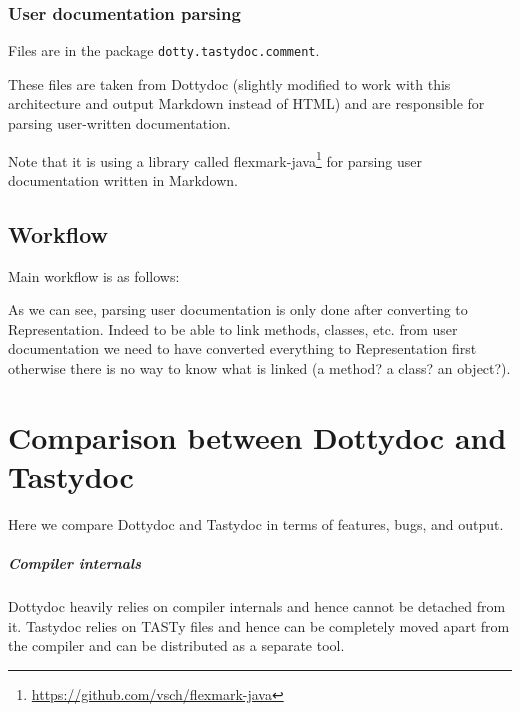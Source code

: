 \documentclass{report}
\begin{document}
\subsection{User documentation parsing}
Files are in the package \texttt{dotty.tastydoc.comment}.

These files are taken from Dottydoc (slightly modified to work with this architecture and output Markdown instead of HTML) and are responsible for parsing user-written documentation.

Note that it is using a library called flexmark-java\footnote{\url{https://github.com/vsch/flexmark-java}} for parsing user documentation written in Markdown.

\section{Workflow}
\label{sec:workflow}
Main workflow is as follows:

\begin{center}
\end{center}

As we can see, parsing user documentation is only done after converting to Representation. Indeed to be able to link methods, classes, etc. from user documentation we need to have converted everything to Representation first otherwise there is no way to know what is linked (a method? a class? an object?).
\chapter{Comparison between Dottydoc and Tastydoc}
Here we compare Dottydoc and Tastydoc in terms of features, bugs, and output.

\paragraph{Compiler internals}
Dottydoc heavily relies on compiler internals and hence cannot be detached from it. Tastydoc relies on TASTy files and hence can be completely moved apart from the compiler and can be distributed as a separate tool.
\end{document}
